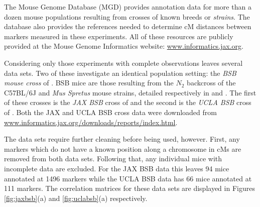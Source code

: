 \documentclass[12pt]{article}
\begin{document}
The Mouse Genome Database (MGD) \cite{bultetal2019mouse} provides annotation data for more than a dozen mouse populations resulting from crosses of known breeds or \emph{strains}. The database also provides the references needed to determine cM distances between markers measured in these experiments. All of these resources are publicly provided at the Mouse Genome Informatics website: \url{www.informatics.jax.org}.

Considering only those experiments with complete observations leaves several data sets. Two of these investigate an identical population setting: the \emph{BSB mouse cross} of \cite{fisleretal1993bsb}. BSB mice are those resulting from the $N_2$ backcross of the C57BL/6J and {\it Mus Spretus} mouse strains, detailed respectively in \cite{C57BL6J} and \cite{dejageretal2009mspretus}. The first of these crosses is the \emph{JAX BSB} cross of \cite{roweetal1994jaxbsb} and the second is the \emph{UCLA BSB} cross of \cite{welchetal1996uclabsb}. Both the JAX and UCLA BSB cross data were downloaded from \url{www.informatics.jax.org/downloads/reports/index.html}.

The data sets require further cleaning before being used, however. First, any markers which do not have a known position along a chromosome in cMs are removed from both data sets. Following that, any individual mice with incomplete data are excluded. For the JAX BSB data this leaves 94 mice annotated at 1496 markers while the UCLA BSB data has 66 mice annotated at 111 markers. The correlation matrices for these data sets are displayed in Figures \ref{fig:jaxbsb}(a) and \ref{fig:uclabsb}(a) respectively.
\end{document}
